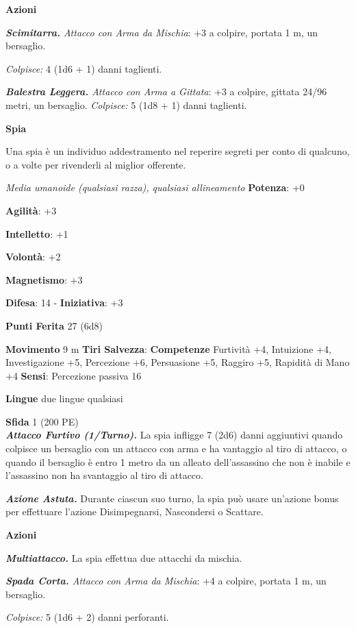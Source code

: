 \begin{multicols}{2}
\smallskip\textbf{Azioni}

\emph{\textbf{Scimitarra.} Attacco con Arma da Mischia}: +3 a colpire,
portata 1 m, un bersaglio.

\emph{Colpisce:} 4 (1d6 + 1) danni taglienti.

\emph{\textbf{Balestra Leggera.} Attacco con Arma a Gittata}: +3 a
colpire, gittata 24/96 metri, un bersaglio. \emph{Colpisce:} 5 (1d8 + 1)
danni taglienti.

\textbf{Spia}

Una spia è un individuo addestramento nel reperire segreti per conto di
qualcuno, o a volte per rivenderli al miglior offerente.

\emph{Media umanoide (qualsiasi razza), qualsiasi allineamento}
\textbf{Potenza}: +0

\textbf{Agilità}: +3

\textbf{Intelletto}: +1

\textbf{Volontà}: +2

\textbf{Magnetismo}: +3

\textbf{Difesa}: 14 - \textbf{Iniziativa}: +3

\textbf{Punti Ferita} 27 (6d8)

\textbf{Movimento} 9 m
\textbf{Tiri Salvezza}:
\textbf{Competenze} Furtività +4, Intuizione +4, Investigazione +5,
Percezione +6, Persuasione +5, Raggiro +5, Rapidità di Mano +4
\textbf{Sensi}: Percezione passiva 16

\textbf{Lingue} due lingue qualsiasi

\textbf{Sfida} 1 (200 PE)\smallskip\\

\emph{\textbf{Attacco Furtivo (1/Turno).}} La spia infligge 7 (2d6)
danni aggiuntivi quando colpisce un bersaglio con un attacco con arma e
ha vantaggio al tiro di attacco, o quando il bersaglio è entro 1 metro
da un alleato dell'assassino che non è inabile e l'assassino non ha
svantaggio al tiro di attacco.

\emph{\textbf{Azione Astuta.}} Durante ciascun suo turno, la spia può
usare un'azione bonus per effettuare l'azione Disimpegnarsi, Nascondersi
o Scattare.

\smallskip\textbf{Azioni}

\emph{\textbf{Multiattacco.}} La spia effettua due attacchi da mischia.

\emph{\textbf{Spada Corta.} Attacco con Arma da Mischia}: +4 a colpire,
portata 1 m, un bersaglio.

\emph{Colpisce:} 5 (1d6 + 2) danni perforanti.


\end{multicols}
